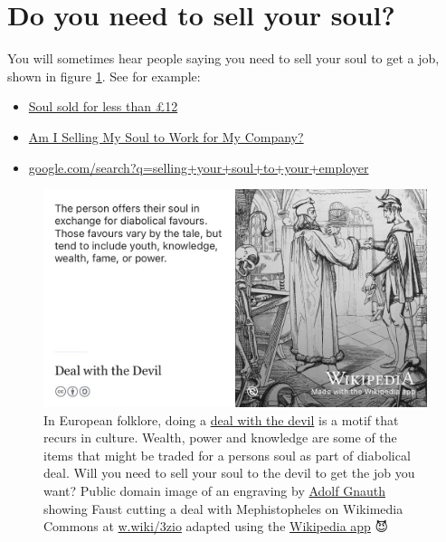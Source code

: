 \documentclass[
]{book}
\providecommand{\tightlist}{%
  \setlength{\itemsep}{0pt}\setlength{\parskip}{0pt}}
\begin{document}
\hypertarget{soul}{%
\section{Do you need to sell your soul?}\label{soul}}

You will sometimes hear people saying you need to sell your soul to get a job, shown in figure \ref{fig:diabolical-fig}. See for example:

\begin{itemize}
\tightlist
\item
  \href{http://news.bbc.co.uk/1/hi/england/2051061.stm}{Soul sold for less than £12} \citep{bbcsoul}
\item
  \href{https://www.thevectorimpact.com/selling-your-soul/}{Am I Selling My Soul to Work for My Company?} \citep{sellmysoul}
\item
  \href{https://www.google.com/search?q=selling+your+soul+to+your+employer}{google.com/search?q=selling+your+soul+to+your+employer}
\end{itemize}

\begin{figure}

{\centering \includegraphics[width=1\linewidth]{images/deal-with-the-devil} 

}

\caption{In European folklore, doing a \href{https://en.wikipedia.org/wiki/Deal_with_the_Devil}{deal with the devil} is a motif that recurs in culture. Wealth, power and knowledge are some of the items that might be traded for a persons soul as part of diabolical deal. Will you need to sell your soul to the devil to get the job you want? Public domain image of an engraving by \href{https://de.wikipedia.org/wiki/Adolf_Gnauth}{Adolf Gnauth} showing Faust cutting a deal with Mephistopheles on Wikimedia Commons at \href{https://w.wiki/3zio}{w.wiki/3zio} adapted using the \href{https://apps.apple.com/gb/app/wikipedia/id324715238}{Wikipedia app} 😈}\label{fig:diabolical-fig}
\end{figure}
\end{document}

